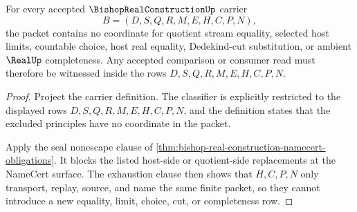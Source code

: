 \begin{theorem}
\label{thm:bishop-real-construction-ledger-nonescape}
For every accepted $\BishopRealConstructionUp$ carrier
$$
B=(D,S,Q,R,M,E,H,C,P,N),
$$
the packet contains no coordinate for quotient stream equality, selected host limits, countable choice, host real equality, Dedekind-cut substitution, or ambient $\RealUp$ completeness. Any accepted comparison or consumer read must therefore be witnessed inside the rows $D,S,Q,R,M,E,H,C,P,N$.
\end{theorem}
\begin{proof}
Project the carrier definition. The classifier is explicitly restricted to the displayed rows $D,S,Q,R,M,E,H,C,P,N$, and the definition states that the excluded principles have no coordinate in the packet.

Apply the seal nonescape clause of \autoref{thm:bishop-real-construction-namecert-obligations}. It blocks the listed host-side or quotient-side replacements at the NameCert surface. The exhaustion clause then shows that $H,C,P,N$ only transport, replay, source, and name the same finite packet, so they cannot introduce a new equality, limit, choice, cut, or completeness row.
\end{proof}


\begin{closurestatus}{\BishopRealConstructionUp}
  \theoryclosure{\seedClosure}
  \formalstatus{\unformalizedV}
\end{closurestatus}
